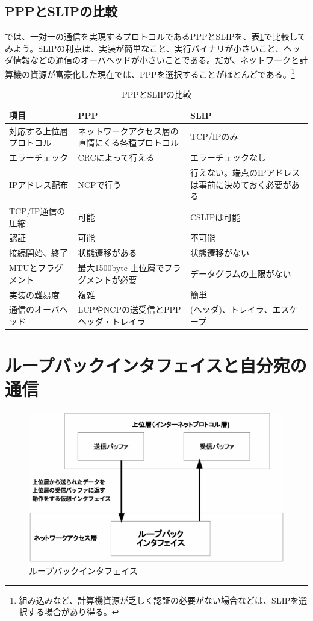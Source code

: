 \subsection{PPPとSLIPの比較}

では、一対一の通信を実現するプロトコルであるPPPとSLIPを、表\ref{pppslip}で比較してみよう。SLIPの利点は、実装が簡単なこと、実行バイナリが小さいこと、ヘッダ情報などの通信のオーバヘッドが小さいことである。だが、ネットワークと計算機の資源が富豪化した現在では、PPPを選択することがほとんどである。\footnote{組み込みなど、計算機資源が乏しく認証の必要がない場合などは、SLIPを選択する場合があり得る。}

\begin{table}[hbtp] \caption{PPPとSLIPの比較} \label{pppslip}
\begin{center}
	\begin{tabularx}{110mm}{lXX} \toprule
		項目 & PPP & SLIP \\ \midrule
		対応する上位層プロトコル & ネットワークアクセス層の直情にくる各種プロトコル  & TCP/IPのみ \\
		エラーチェック & CRCによって行える & エラーチェックなし \\
		IPアドレス配布 & NCPで行う & 行えない。端点のIPアドレスは事前に決めておく必要がある \\
		TCP/IP通信の圧縮 & 可能 & CSLIPは可能 \\
		認証 & 可能 & 不可能 \\
		接続開始、終了 & 状態遷移がある & 状態遷移がない \\
		MTUとフラグメント & 最大1500byte 上位層でフラグメントが必要 & データグラムの上限がない \\
		実装の難易度 & 複雑 & 簡単 \\
		通信のオーバヘッド & LCPやNCPの送受信とPPPヘッダ・トレイラ & (ヘッダ)、トレイラ、エスケープ \\ \bottomrule
	\end{tabularx}
\end{center}
\end{table}

\section{ループバックインタフェイスと自分宛の通信}

\begin{figure}[htbp]
	\includegraphics[width=12cm,clip]{draw/loopback.eps}
	\caption{ループバックインタフェイス}
	\label{fig:loopback}
\end{figure}

